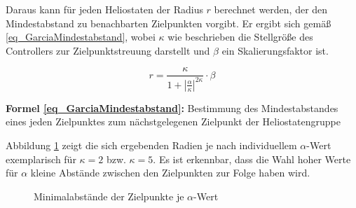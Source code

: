 Daraus kann für jeden Heliostaten der Radius $r$ berechnet werden, der den Mindestabstand zu benachbarten Zielpunkten vorgibt.
Er ergibt sich gemäß \ref{eq_GarciaMindestabstand}, wobei $\kappa$ wie beschrieben die Stellgröße des Controllers zur Zielpunktstreuung darstellt und $\beta$ ein Skalierungsfaktor ist.

\begin{equation} \label{eq_GarciaMindestabstand}
    r=\frac{\kappa}{1+\left|\frac{\alpha}{\kappa}\right|^{2\kappa}}\cdot\beta
\end{equation}
\begin{center}
    \begin{varwidth}{0.95\textwidth}
\small{\textsf{\textbf{Formel \ref{eq_GarciaMindestabstand}:}} Bestimmung des Mindestabstandes eines jeden Zielpunktes zum nächstgelegenen Zielpunkt der Heliostatengruppe}
    \end{varwidth}
\end{center}

Abbildung \ref{fig_Verteilunglpha} zeigt die sich ergebenden Radien je nach individuellem $\alpha$-Wert exemplarisch für $\kappa=2$ bzw. $\kappa=5$.
Es ist erkennbar, dass die Wahl hoher Werte für $\alpha$ kleine Abstände zwischen den Zielpunkten zur Folge haben wird.

\begin{figure}[h!]
    \centering
    \setlength{\fboxsep}{1pt}
    \setlength{\fboxrule}{1pt}
\caption[Minimalabstände der Zielpunkte je $\alpha$-Wert]{Minimalabstände der Zielpunkte je $\alpha$-Wert \cite[S. 9]{Garcia2}}
    \label{fig_Verteilunglpha}
\end{figure}

